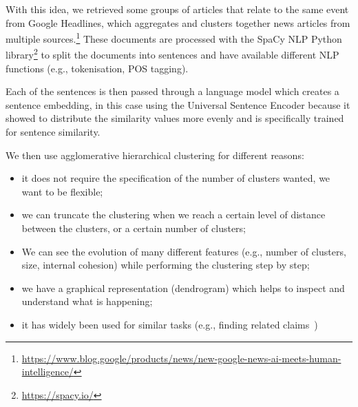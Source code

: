 With this idea, we retrieved some groups of articles that relate to the same event from Google Headlines, which aggregates and clusters together news articles from multiple sources.\footnote{\url{https://www.blog.google/products/news/new-google-news-ai-meets-human-intelligence/}}
These documents are processed with the SpaCy NLP Python library\footnote{\url{https://spacy.io/}} to split the documents into sentences and have available different NLP functions (e.g., tokenisation, POS tagging).

Each of the sentences is then passed through a language model which creates a sentence embedding, in this case using the Universal Sentence Encoder because it showed to distribute the similarity values more evenly and is specifically trained for sentence similarity.

We then use agglomerative hierarchical clustering for different reasons:
\begin{itemize}
    \item it does not require the specification of the number of clusters wanted, we want to be flexible;
    \item we can truncate the clustering when we reach a certain level of distance between the clusters, or a certain number of clusters;
    \item We can see the evolution of many different features (e.g., number of clusters, size, internal cohesion) while performing the clustering step by step;
    \item we have a graphical representation (dendrogram) which helps to inspect and understand what is happening;
    \item it has widely been used for similar tasks (e.g., finding related claims~\cite{almeida2020text})
\end{itemize}


